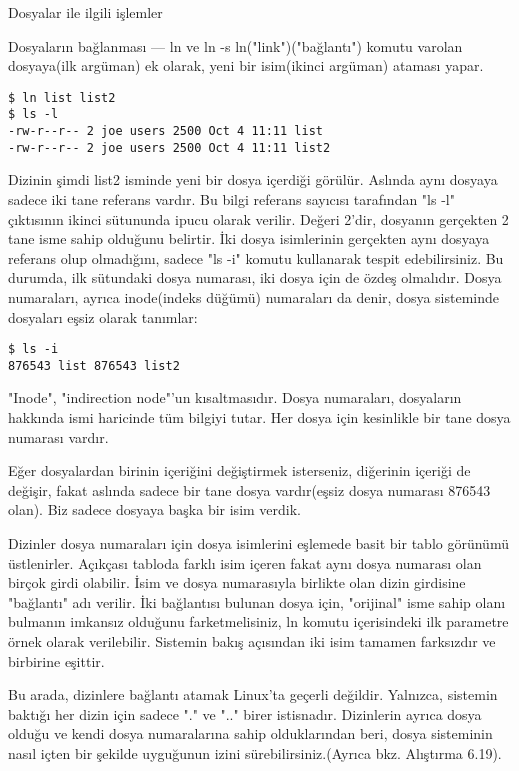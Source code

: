 \documentclass[10pt,a5paper]{book}
\begin{document}
\begin{section}{Dosyalar ile ilgili işlemler}
\begin{subsection}{Dosyaların bağlanması — ln ve ln -s}
ln("link")("bağlantı") komutu varolan dosyaya(ilk argüman) ek olarak, yeni bir isim(ikinci argüman) ataması yapar.
\begin{verbatim}
$ ln list list2
$ ls -l
-rw-r--r-- 2 joe users 2500 Oct 4 11:11 list
-rw-r--r-- 2 joe users 2500 Oct 4 11:11 list2
\end{verbatim}
Dizinin şimdi list2 isminde yeni bir dosya içerdiği görülür. Aslında aynı dosyaya sadece iki tane referans vardır. Bu bilgi referans sayıcısı tarafından "ls -l" çıktısının ikinci sütununda ipucu olarak verilir. Değeri 2'dir, dosyanın gerçekten 2 tane isme sahip olduğunu belirtir. İki dosya isimlerinin gerçekten aynı dosyaya referans olup olmadığını, sadece "ls -i" komutu kullanarak tespit edebilirsiniz. Bu durumda, ilk sütundaki dosya numarası, iki dosya için de özdeş olmalıdır. Dosya numaraları, ayrıca inode(indeks düğümü) numaraları da denir, dosya sisteminde dosyaları eşsiz olarak tanımlar:
\begin{verbatim}
$ ls -i
876543 list 876543 list2
\end{verbatim}
"Inode", "indirection node"'un kısaltmasıdır. Dosya numaraları, dosyaların hakkında ismi haricinde tüm bilgiyi tutar. Her dosya için kesinlikle bir tane dosya numarası vardır.

Eğer dosyalardan birinin içeriğini değiştirmek isterseniz, diğerinin içeriği de değişir, fakat aslında sadece bir tane dosya vardır(eşsiz dosya numarası 876543 olan). Biz sadece dosyaya başka bir isim verdik.

Dizinler dosya numaraları için dosya isimlerini eşlemede basit bir tablo görünümü üstlenirler. Açıkçası tabloda farklı isim içeren fakat aynı dosya numarası olan birçok girdi olabilir. İsim ve dosya numarasıyla birlikte olan dizin girdisine "bağlantı" adı verilir. İki bağlantısı bulunan dosya için, "orijinal" isme sahip olanı bulmanın imkansız olduğunu farketmelisiniz, ln komutu içerisindeki ilk parametre örnek olarak verilebilir. Sistemin bakış açısından iki isim tamamen farksızdır ve birbirine eşittir.

Bu arada, dizinlere bağlantı atamak Linux'ta geçerli değildir. Yalnızca, sistemin baktığı her dizin için  sadece "." ve ".." birer istisnadır. Dizinlerin ayrıca dosya olduğu ve kendi dosya numaralarına sahip olduklarından beri, dosya sisteminin nasıl içten bir şekilde uyguğunun izini sürebilirsiniz.(Ayrıca bkz. Alıştırma 6.19).


\end{subsection}
\end{section}
\end{document}
